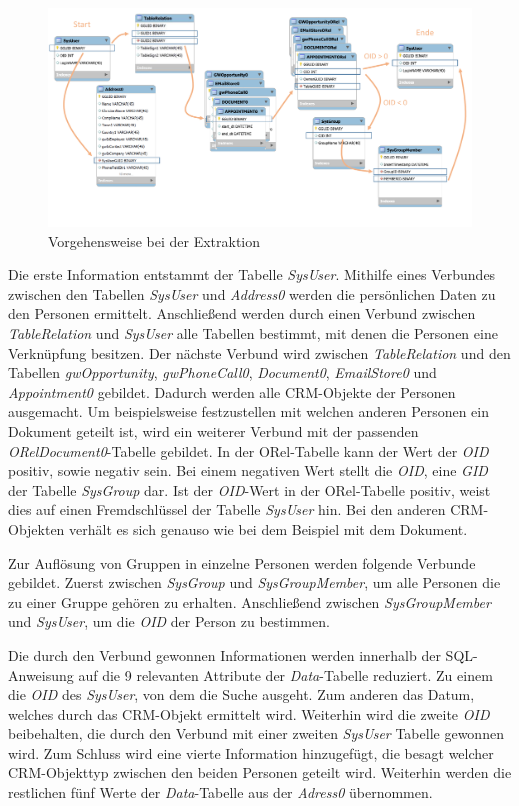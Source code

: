 \begin{figure}[htbp]
\centering
  \includegraphics[width=1.0\textwidth]{pics/konzept_extraktion.pdf}
\caption{Vorgehensweise bei der Extraktion}
\label{umsetzung_extract}
\end{figure} 

Die erste Information entstammt der Tabelle \textit{SysUser}. Mithilfe eines Verbundes zwischen den Tabellen \textit{SysUser} und \textit{Address0} werden die persönlichen Daten zu den Personen ermittelt. Anschließend werden durch einen Verbund zwischen \textit{TableRelation} und \textit{SysUser} alle Tabellen bestimmt, mit denen die Personen eine Verknüpfung besitzen. Der nächste Verbund wird zwischen \textit{TableRelation} und den Tabellen \textit{gwOpportunity}, \textit{gwPhoneCall0}, \textit{Document0}, \textit{EmailStore0} und \textit{Appointment0} gebildet. Dadurch werden alle CRM-Objekte der Personen ausgemacht. Um beispielsweise festzustellen mit welchen anderen Personen ein Dokument geteilt ist, wird ein weiterer Verbund mit der passenden \textit{ORelDocument0}-Tabelle gebildet. In der ORel-Tabelle kann der Wert der \textit{OID} positiv, sowie negativ sein. Bei einem negativen Wert stellt die \textit{OID}, eine \textit{GID} der Tabelle \textit{SysGroup} dar. Ist der \textit{OID}-Wert in der ORel-Tabelle positiv, weist dies auf einen Fremdschlüssel der Tabelle \textit{SysUser} hin. Bei den anderen CRM-Objekten verhält es sich genauso wie bei dem Beispiel mit dem Dokument.

Zur Auflösung von Gruppen in einzelne Personen werden folgende Verbunde gebildet. Zuerst zwischen \textit{SysGroup} und \textit{SysGroupMember}, um alle Personen die zu einer Gruppe gehören zu erhalten. Anschließend zwischen \textit{SysGroupMember} und \textit{SysUser}, um die \textit{OID} der Person zu bestimmen.

Die durch den Verbund gewonnen Informationen werden innerhalb der SQL-Anweisung auf die 9 relevanten Attribute der \textit{Data}-Tabelle reduziert. Zu einem die \textit{OID} des \textit{SysUser}, von dem die Suche ausgeht. Zum anderen das Datum, welches durch das CRM-Objekt ermittelt wird. Weiterhin wird die zweite \textit{OID} beibehalten, die durch den Verbund mit einer zweiten \textit{SysUser} Tabelle gewonnen wird. Zum Schluss wird eine vierte Information hinzugefügt, die besagt welcher CRM-Objekttyp  zwischen den beiden Personen geteilt wird. Weiterhin werden die restlichen fünf Werte der \textit{Data}-Tabelle aus der \textit{Adress0} übernommen. 

